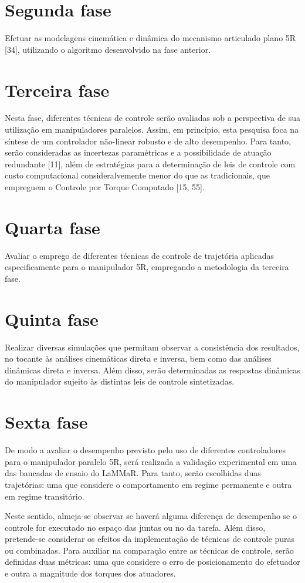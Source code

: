 \documentclass[]{politex}
\begin{document}
\section{Segunda fase} 
Efetuar as modelagens cinemática e dinâmica do mecanismo articulado plano 5R [34], utilizando o algoritmo desenvolvido na fase anterior.

\section{Terceira fase} 
Nesta fase, diferentes técnicas de controle serão avaliadas sob a perspectiva de sua utilização em manipuladores paralelos. Assim, 
em princípio, esta pesquisa foca na síntese de um controlador não-linear robusto e de alto desempenho. Para tanto, serão consideradas as incertezas paramétricas e a possibilidade de atuação redundante [11], além de estratégias para a determinação de leis de controle com custo computacional
consideralvemente menor do que as tradicionais, que empreguem o Controle por Torque Computado [15, 55].

\section{Quarta fase} Avaliar o emprego de diferentes técnicas de controle de trajetória aplicadas especificamente para o manipulador 5R,
empregando a metodologia da terceira fase.

\section{Quinta fase} Realizar diversas simulações que permitam observar a consistência dos resultados, no tocante às análises cinemáticas direta e inversa, bem como das análises dinâmicas direta e inversa. Além disso, serão determinadas as respostas dinâmicas do manipulador sujeito às distintas leis de controle sintetizadas.

\section{Sexta fase} 
De modo a avaliar o desempenho previsto pelo uso de diferentes controladores para o manipulador paralelo 5R, será realizada a validação experimental em uma das bancadas de ensaio do LaMMaR. Para tanto, serão escolhidas duas trajetórias: uma que considere o comportamento em regime permanente e outra em regime transitório. 

Neste sentido, almeja-se observar se haverá alguma diferença de desempenho se o controle for executado no espaço das juntas ou no da tarefa. Além disso, pretende-se considerar os efeitos da implementação de técnicas de controle puras ou combinadas.
Para auxiliar na comparação entre as técnicas de controle, serão definidas duas métricas: uma que considere o erro de posicionamento do efetuador e outra a magnitude dos torques dos atuadores.
\end{document}

